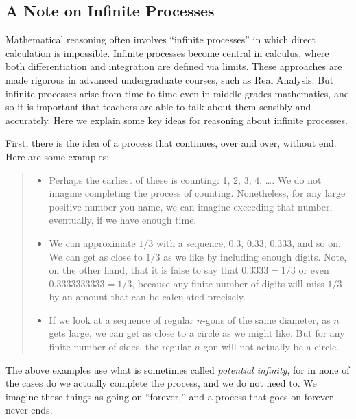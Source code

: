 \subsection{A Note on Infinite Processes}
Mathematical reasoning often involves ``infinite processes'' in which direct calculation is impossible.  Infinite processes become central in calculus, where both differentiation and integration are defined via limits.  These approaches are made rigorous in advanced undergraduate courses, such as Real Analysis.  But infinite processes arise from time to time even in middle grades mathematics, and so it is important that teachers are able to talk about them sensibly and accurately.  Here we explain some key ideas for reasoning about infinite processes.  

First, there is the idea of a process that continues, over and over, without end.  
Here are some examples:
\begin{quote}
\begin{itemize}
\item Perhaps the earliest of these is counting: 1, 2, 3, 4, \dots.  We do not imagine completing the process of counting.  Nonetheless, for any large positive number you name, we can imagine exceeding that number, eventually, if we have enough time.  
\item We can approximate $1/3$ with a sequence, $0.3$, $0.33$, $0.333$, and so on.  We can get as close to $1/3$ as we like by including enough digits.  Note, on the other hand, that it is false to say that $0.3333 = 1/3$ or even $0.3333333333 = 1/3$, because any finite number of digits will miss $1/3$ by an amount that can be calculated precisely.  
\item If we look at a sequence of regular $n$-gons of the same diameter, as $n$ gets large, we can get as close to a circle as we might like.  But for any finite number of sides, the regular $n$-gon will not actually be a circle.  
\end{itemize}
\end{quote}

The above examples use what is sometimes called \emph{potential infinity}, for in none of the cases do we actually complete the process, and we do not need to.  We imagine these things as going on ``forever,'' and a process that goes on forever never ends.  

